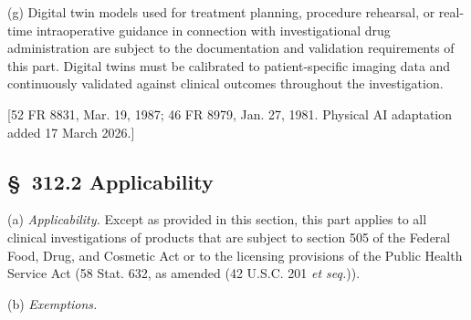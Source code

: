 \documentclass[11pt]{article}
\begin{document}
(g) Digital twin models used for treatment planning, procedure rehearsal, or real-time intraoperative guidance in connection with investigational drug administration are subject to the documentation and validation requirements of this part. Digital twins must be calibrated to patient-specific imaging data and continuously validated against clinical outcomes throughout the investigation.

[52 FR 8831, Mar. 19, 1987; 46 FR 8979, Jan. 27, 1981. Physical AI adaptation added 17 March 2026.]

\subsection{\S~312.2 Applicability}

(a) \textit{Applicability.} Except as provided in this section, this part applies to all clinical investigations of products that are subject to section 505 of the Federal Food, Drug, and Cosmetic Act or to the licensing provisions of the Public Health Service Act (58 Stat. 632, as amended (42 U.S.C. 201 \textit{et seq.})).

(b) \textit{Exemptions.}
\end{document}
